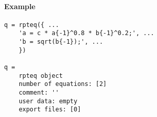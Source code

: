 \paragraph{Example}

\begin{verbatim}
q = rpteq({ ...
    'a = c * a{-1}^0.8 * b{-1}^0.2;', ...
    'b = sqrt(b{-1});', ...
    })

q =
    rpteq object
    number of equations: [2]
    comment: ''
    user data: empty
    export files: [0]
\end{verbatim}


